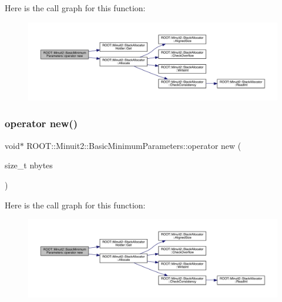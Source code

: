 Here is the call graph for this function\+:
\nopagebreak
\begin{figure}[H]
\begin{center}
\leavevmode
\includegraphics[width=350pt]{da/d30/classROOT_1_1Minuit2_1_1BasicMinimumParameters_a5258a9959c0b6ff699a9200dad4caee0_cgraph}
\end{center}
\end{figure}
\mbox{\label{classROOT_1_1Minuit2_1_1BasicMinimumParameters_a5258a9959c0b6ff699a9200dad4caee0}} 
\subsubsection{\texorpdfstring{operator new()}{operator new()}\hspace{0.1cm}{\footnotesize\ttfamily [3/3]}}
{\footnotesize\ttfamily void$\ast$ R\+O\+O\+T\+::\+Minuit2\+::\+Basic\+Minimum\+Parameters\+::operator new (\begin{DoxyParamCaption}\item[{size\+\_\+t}]{nbytes }\end{DoxyParamCaption})\hspace{0.3cm}{\ttfamily [inline]}}

Here is the call graph for this function\+:
\nopagebreak
\begin{figure}[H]
\begin{center}
\leavevmode
\includegraphics[width=350pt]{da/d30/classROOT_1_1Minuit2_1_1BasicMinimumParameters_a5258a9959c0b6ff699a9200dad4caee0_cgraph}
\end{center}
\end{figure}
\mbox{\label{classROOT_1_1Minuit2_1_1BasicMinimumParameters_a468d3eefd1f7080b499f090afdb3eab4}} 
